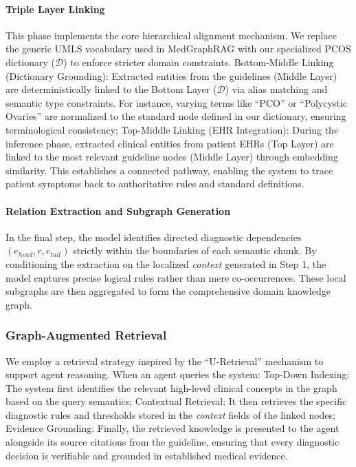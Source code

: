\documentclass[a4paper,fleqn]{cas-dc}
\begin{document}
\paragraph{Triple Layer Linking}
This phase implements the core hierarchical alignment mechanism. We replace the generic UMLS vocabulary used in MedGraphRAG with our specialized PCOS dictionary ($\mathcal{D}$) to enforce stricter domain constraints. Bottom-Middle Linking (Dictionary Grounding): Extracted entities from the guidelines (Middle Layer) are deterministically linked to the Bottom Layer ($\mathcal{D}$) via alias matching and semantic type constraints. For instance, varying terms like ``PCO'' or ``Polycystic Ovaries'' are normalized to the standard node defined in our dictionary, ensuring terminological consistency; Top-Middle Linking (EHR Integration): During the inference phase, extracted clinical entities from patient EHRs (Top Layer) are linked to the most relevant guideline nodes (Middle Layer) through embedding similarity. This establishes a connected pathway, enabling the system to trace patient symptoms back to authoritative rules and standard definitions.


\paragraph{Relation Extraction and Subgraph Generation}
In the final step, the model identifies directed diagnostic dependencies $(e_{head}, r, e_{tail})$ strictly within the boundaries of each semantic chunk. By conditioning the extraction on the localized \textit{context} generated in Step 1, the model captures precise logical rules rather than mere co-occurrences. These local subgraphs are then aggregated to form the comprehensive domain knowledge graph.

\subsubsection{Graph-Augmented Retrieval}
We employ a retrieval strategy inspired by the ``U-Retrieval'' mechanism \cite{wu-etal-2025-medical} to support agent reasoning. When an agent queries the system: Top-Down Indexing: The system first identifies the relevant high-level clinical concepts in the graph based on the query semantics; Contextual Retrieval: It then retrieves the specific diagnostic rules and thresholds stored in the \textit{context} fields of the linked nodes; Evidence Grounding: Finally, the retrieved knowledge is presented to the agent alongside its source citations from the guideline, ensuring that every diagnostic decision is verifiable and grounded in established medical evidence.
    
\end{document}
